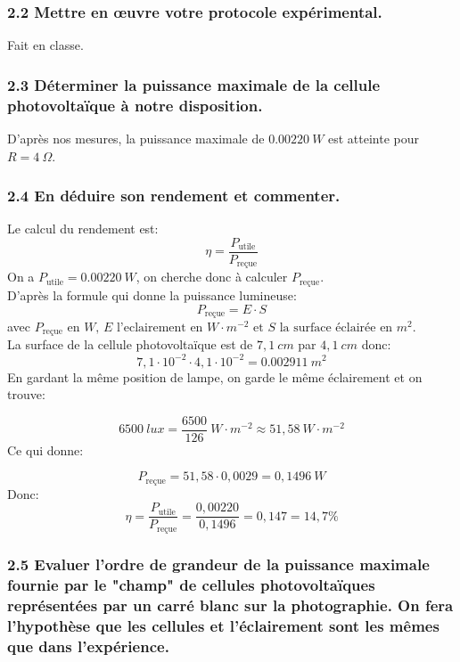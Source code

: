 \documentclass[a4paper,12pt]{scrartcl}
\begin{document}
\subsubsection*{2.2 Mettre en œuvre votre protocole expérimental.}

Fait en classe.

\subsubsection*{2.3 Déterminer la puissance maximale de la cellule photovoltaïque à notre
disposition.}

D'après nos mesures, la puissance maximale de $0.00220\ W$ est atteinte pour $R = 4\ \Omega$.

\subsubsection*{2.4 En déduire son rendement et commenter.}
 
Le calcul du rendement est:
\[\eta = \frac{P_{\text{utile}}}{P_{\text{re\c{c}ue}}}\]
On a $P_{\text{utile}} = 0.00220\ W$, on cherche donc à calculer ${P_{\text{re\c{c}ue}}}$.
\\
D'après la formule qui donne la puissance lumineuse:
\[P_{\text{re\c{c}ue}} = E \cdot S\] avec $P_{\text{re\c{c}ue}} \text{ en } W \text{, } E \text{ l'eclairement en } 
W \cdot m^{-2} \text{ et } S \text{ la surface éclairée en } m^2$.
\\
La surface de la cellule photovoltaïque est de $7,1\ cm$ par $4,1\ cm$ donc:
\[7,1 \cdot 10^{-2} \cdot 4,1 \cdot 10^{-2} = 0.002911\ m^2\]
En gardant la même position de lampe, on garde le même éclairement et on trouve: 
 
\[6500\ lux = \frac{6500}{126}\ W\cdot m^{-2} \approx 51,58\ W \cdot m^{-2}\]
Ce qui donne:

\[P_{\text{re\c{c}ue}} = 51,58 \cdot 0,0029 = 0,1496\ W\]
Donc:
\[ \eta = \frac{P_{\text{utile}}}{P_{\text{re\c{c}ue}}} = \frac{0,00220}{0,1496} = 0,147 = 14,7\%\]

\subsubsection*{2.5 Evaluer l'ordre de grandeur de la puissance maximale fournie par le "champ" de cellules 
photovoltaïques représentées par un carré blanc sur la photographie. On
fera l'hypothèse que les cellules et l'éclairement sont les mêmes que dans l'expérience.}
 
\end{document}
